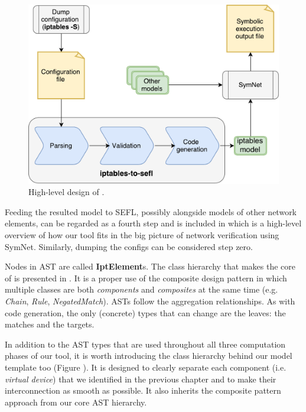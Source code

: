 \begin{figure}[h]
  \centering
  \captionsetup{justification=centering}
  \includegraphics[scale=0.5]{assets/img/high-level-design}
  \caption{High-level design of \TOOL.}
  \label{fig:high-level-design}
\end{figure}

Feeding the resulted model to SEFL, possibly alongside models of other network
elements, can be regarded as a fourth step and is included in
 which is a high-level overview of
how our tool fits in the big picture of network verification using SymNet.
Similarly, dumping the configs can be considered step zero.

Nodes in AST are called \textbf{IptElement}s.  The class hierarchy that makes
the core of \TOOL is presented in .
It is a proper use of the composite design pattern in which multiple classes
are both \emph{components} and \emph{composites} at the same time (e.g.
\emph{Chain}, \emph{Rule}, \emph{NegatedMatch}).  ASTs follow the aggregation
relationships.  As with code generation, the only (concrete) types that can
change are the leaves: the matches and the targets.

In addition to the AST types that are used throughout all three computation
phases of our tool, it is worth introducing the class hierarchy behind our
model template too (Figure ).  It
is designed to clearly separate each component (i.e.  \emph{virtual device})
that we identified in the previous chapter and to make their interconnection as
smooth as possible. It also inherits the composite pattern approach from our
core AST hierarchy.

